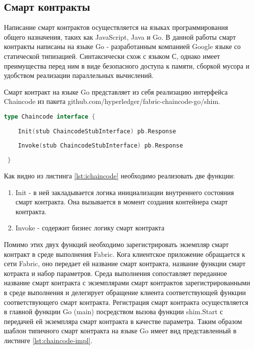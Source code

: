 \subsection{Смарт контракты} \label{subsec:ch2/sec2/subsec2}

Написание смарт контрактов осуществляется на языках программирования общего назначения, таких как JavaScript, Java и Go. В данной работы смарт контракты написаны на языке Go - разработанным компанией Google языке со статической типизацией. Синтаксически схож с  языком С, однако имеет преимущества перед ним в виде безопасного доступа к памяти, сборкой мусора и удобством реализации параллельных вычислений.

Смарт контракт на языке Go представляет из себя реализацию интерфейса Chaincode из пакета github.com/hyperledger/fabric-chaincode-go/shim.
 
\begin{lstlisting}[caption={Интерфейс Chaincode},label={lst:ichaincode},language=Go]
 type Chaincode interface {
 	
 	Init(stub ChaincodeStubInterface) pb.Response
 
 	Invoke(stub ChaincodeStubInterface) pb.Response
 	
 }
\end{lstlisting}
 
Как видно из листинга \ref{lst:ichaincode} необходимо реализовать две функции: 

\begin{enumerate}
	\item Init - в ней закладывается логика инициализации внутреннего состояния смарт контракта. Она вызывается в момент создания контейнера смарт контракта.
	\item Invoke - содержит бизнес логику смарт контракта
\end{enumerate}

Помимо этих двух функций необходимо зарегистрировать экземпляр  смарт контракт в среде выполнения Fabric. Кога клиентское приложение обращается к сети Fabric, оно передает ей название смарт контракта, название функции смарт котракта и набор параметров. Среда выполнения сопоставляет переданное название смарт контракта с экземплярами смарт контрактов зарегистрированными в среде выполнения и делегирует обращение клиента соответствующей функции соответствующего смарт контракта. Регистрация смарт контракта осуществляется в главной функции Go (main) посредством вызова функции shim.Start с передачей ей экземпляра смарт контракта в качестве параметра. Таким образом шаблон типичного смарт контракта на языке Go имеет вид представленный в листинге \ref{lst:chaincode-impl}.

